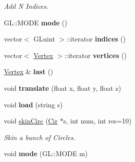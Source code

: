 \begin{DoxyCompactItemize}
\begin{DoxyCompactList}\small\item\em Add N Indices. \end{DoxyCompactList}\item 
\hypertarget{structvsr_1_1_mesh_aa1f5053ba53424b4be9199cb988a06e8}{G\-L\-::\-M\-O\-D\-E {\bfseries mode} ()}\label{structvsr_1_1_mesh_aa1f5053ba53424b4be9199cb988a06e8}

\item 
\hypertarget{structvsr_1_1_mesh_a7021a17b6cda8470a794845060172fbb}{vector$<$ G\-Luint $>$\-::iterator {\bfseries indices} ()}\label{structvsr_1_1_mesh_a7021a17b6cda8470a794845060172fbb}

\item 
\hypertarget{structvsr_1_1_mesh_abc03acee64f3ce59a16e74baced71a2d}{vector$<$ \hyperlink{structvsr_1_1_vertex}{Vertex} $>$\-::iterator {\bfseries vertices} ()}\label{structvsr_1_1_mesh_abc03acee64f3ce59a16e74baced71a2d}

\item 
\hypertarget{structvsr_1_1_mesh_a07e3ae1957bfa7c40bff52f0b7adef7c}{\hyperlink{structvsr_1_1_vertex}{Vertex} \& {\bfseries last} ()}\label{structvsr_1_1_mesh_a07e3ae1957bfa7c40bff52f0b7adef7c}

\item 
\hypertarget{structvsr_1_1_mesh_a1e4c0ee0ddd0b0edf996d5c63381331a}{void {\bfseries translate} (float x, float y, float z)}\label{structvsr_1_1_mesh_a1e4c0ee0ddd0b0edf996d5c63381331a}

\item 
\hypertarget{structvsr_1_1_mesh_a3080a2e7dabc9f466c1ba7a8b52e86a6}{void {\bfseries load} (string s)}\label{structvsr_1_1_mesh_a3080a2e7dabc9f466c1ba7a8b52e86a6}

\item 
\hypertarget{structvsr_1_1_mesh_a2d9784a0d8698bca518d242734375bfb}{void \hyperlink{structvsr_1_1_mesh_a2d9784a0d8698bca518d242734375bfb}{skin\-Circ} (\hyperlink{namespacevsr_a2744605aa828e495fc85463b7ae0d045}{Cir} $\ast$s, int num, int res=10)}\label{structvsr_1_1_mesh_a2d9784a0d8698bca518d242734375bfb}

\begin{DoxyCompactList}\small\item\em Skin a bunch of Circles. \end{DoxyCompactList}\item 
\hypertarget{structvsr_1_1_mesh_a14a7a19827911fb814b9c7adba127987}{void {\bfseries mode} (G\-L\-::\-M\-O\-D\-E m)}\label{structvsr_1_1_mesh_a14a7a19827911fb814b9c7adba127987}


\end{DoxyCompactItemize}
